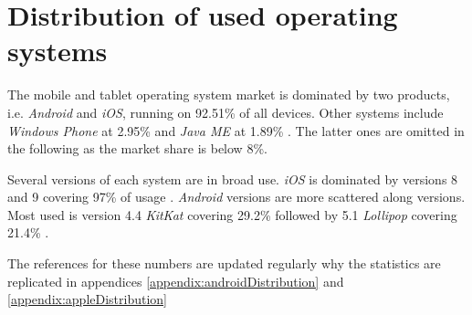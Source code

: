 \section{Distribution of used operating systems}\label{preStudy:devices}

The mobile and tablet operating system market is dominated by two products, i.e. \textit{Android} and \textit{iOS}, running on 92.51\% of all devices. 
Other systems include \textit{Windows Phone} at 2.95\% and \textit{Java ME} at 1.89\% \citep{preStudy:devices:companies}.
The latter ones are omitted in the following as the market share is below 8\%.

Several versions of each system are in broad use.
\textit{iOS} is dominated by versions 8 and 9 covering 97\% of usage \citep{preStudy:devices:apple}.
\textit{Android} versions are more scattered along versions. 
Most used is version 4.4 \textit{KitKat} covering 29.2\% followed by 5.1 \textit{Lollipop} covering 21.4\% \citep{preStudy:devices:android}.

The references for these numbers are updated regularly why the statistics are replicated in appendices \ref{appendix:androidDistribution} and \ref{appendix:appleDistribution}
